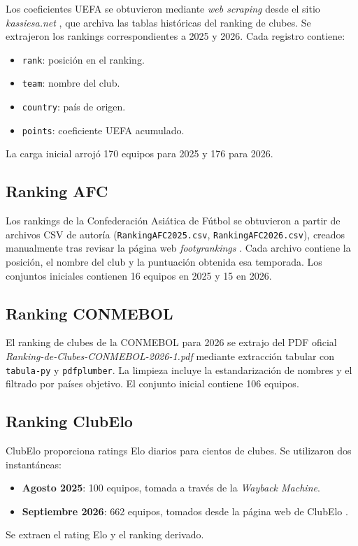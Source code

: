 Los coeficientes UEFA se obtuvieron mediante \textit{web scraping} desde el sitio \textit{kassiesa.net} \cite{kassiesa2025, kassiesa2026}, que archiva las tablas hist\'oricas del ranking de clubes. Se extrajeron los rankings correspondientes a 2025 y 2026. Cada registro contiene:
\begin{itemize}
	\item \texttt{rank}: posici\'on en el ranking.
	\item \texttt{team}: nombre del club.
	\item \texttt{country}: pa\'is de origen.
	\item \texttt{points}: coeficiente UEFA acumulado.
\end{itemize}

La carga inicial arroj\'o 170 equipos para 2025 y 176 para 2026.

\subsection{Ranking AFC}

Los rankings de la Confederaci\'on Asi\'atica de F\'utbol se obtuvieron a partir de archivos CSV de autor\'ia (\texttt{RankingAFC2025.csv}, \texttt{RankingAFC2026.csv}), creados manualmente tras revisar la p\'agina web \textit{footyrankings} \cite{footyrankings2025,footyrankings2026}. Cada archivo contiene la posici\'on, el nombre del club y la puntuaci\'on obtenida esa temporada. Los conjuntos iniciales contienen 16 equipos en 2025 y 15 en 2026.

\subsection{Ranking CONMEBOL}

El ranking de clubes de la CONMEBOL para 2026 se extrajo del PDF oficial \textit{Ranking-de-Clubes-CONMEBOL-2026-1.pdf} \cite{conmebol2026} mediante extracci\'on tabular con \texttt{tabula-py} y \texttt{pdfplumber}. La limpieza incluye la estandarizaci\'on de nombres y el filtrado por pa\'ises objetivo. El conjunto inicial contiene 106 equipos.

\subsection{Ranking ClubElo}

ClubElo proporciona ratings Elo diarios para cientos de clubes. Se utilizaron dos instant\'aneas:
\begin{itemize}
	\item \textbf{Agosto 2025}: 100 equipos, tomada a trav\'es de la \textit{Wayback Machine}.
	\item \textbf{Septiembre 2026}: 662 equipos, tomados desde la p\'agina web de ClubElo \cite{clubelo2025}.
\end{itemize}
Se extraen el rating Elo y el ranking derivado.

